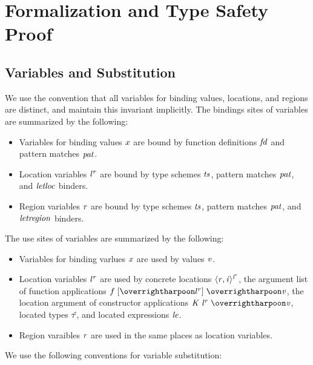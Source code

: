 \documentclass[showabstract,showacknowledgments,showpreface,showdedication]{iuphd}
\theoremstyle{nonumberplain}
\begin{document}


\appendix



\chapter{Formalization and Type Safety Proof}\label{appendix:proof}

\section{Variables and Substitution}
%
We use the convention that all variables for binding values,
locations, and regions are distinct, and maintain this invariant
implicitly.
%
The bindings sites of variables are summarized by the following:
%
\begin{itemize}
\item Variables for binding values $x$ are bound by function definitions
$\mathit{fd}$ and pattern matches $\mathit{pat}$.

\item Location variables ${\mathit{l}}^{\mathit{r}}$ are bound by type schemes $\mathit{ts}$, pattern matches
$\mathit{pat}$, and $\mathit{letloc}$ binders.

\item Region variables $\mathit{r}$ are bound by type schemes $\mathit{ts}$, pattern
matches $\mathit{pat}$, and $\mathit{letregion}$ binders.
\end{itemize}
%
The use sites of variables are summarized by the following:
\begin{itemize}
\item Variables for binding varlues $x$ are used by values $\mathit{v}$.

\item Location variables ${\mathit{l}}^{\mathit{r}}$ are used by concrete locations $\langle \mathit{r}, \mathit{i} \rangle ^{{\mathit{l}}^{\mathit{r}}}$,
the argument list of function applications
$\fapp{\overharpoon{\locreg{l}{r}}}{\overharpoon{\VAL}}$, the location
argument of constructor applications
$\datacon{\DC}{\keywd{\locreg{\loc}{\reg}}}{\overharpoon{\VAL}}$,
located types $\mathit{\hat{\tau}}$, and located expressions $\mathit{le}$.

\item Region varaibles $\mathit{r}$ are used in the same places as location variables.
\end{itemize}
%
We use the following conventions for variable substitution:
\end{document}

